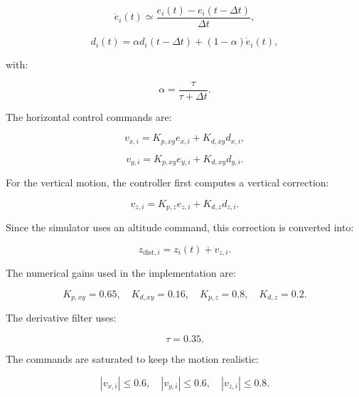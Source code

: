 \begin{equation}
    \dot{e}_i(t) \simeq \frac{e_i(t)-e_i(t-\Delta t)}{\Delta t},
\end{equation}

\begin{equation}
    d_i(t)=\alpha d_i(t-\Delta t)+(1-\alpha)\dot{e}_i(t),
\end{equation}

with:

\begin{equation}
    \alpha=\frac{\tau}{\tau+\Delta t}.
\end{equation}

The horizontal control commands are:

\begin{equation}
    v_{x,i}=K_{p,xy}e_{x,i}+K_{d,xy}d_{x,i},
\end{equation}

\begin{equation}
    v_{y,i}=K_{p,xy}e_{y,i}+K_{d,xy}d_{y,i}.
\end{equation}

For the vertical motion, the controller first computes a vertical correction:

\begin{equation}
    v_{z,i}=K_{p,z}e_{z,i}+K_{d,z}d_{z,i}.
\end{equation}

Since the simulator uses an altitude command, this correction is converted into:

\begin{equation}
    z_{\text{dist},i}=z_i(t)+v_{z,i}.
\end{equation}

The numerical gains used in the implementation are:

\begin{equation}
    K_{p,xy}=0.65, \quad K_{d,xy}=0.16, \quad K_{p,z}=0.8, \quad K_{d,z}=0.2.
\end{equation}

The derivative filter uses:

\begin{equation}
    \tau=0.35.
\end{equation}

The commands are saturated to keep the motion realistic:

\begin{equation}
    |v_{x,i}|\leq 0.6, \quad |v_{y,i}|\leq 0.6, \quad |v_{z,i}|\leq 0.8.
\end{equation}

